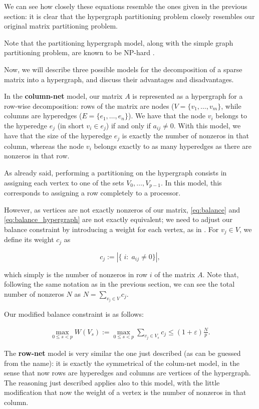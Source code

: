 We can see how closely these equations resemble the ones given in the previous section: it is clear that the hypergraph partitioning problem closely resembles our original matrix partitioning problem.

Note that the partitioning hypergraph model, along with the simple graph partitioning problem, are known to be NP-hard \cite[Ch.~6]{lengauer}. 

Now, we will describe three possible models for the decomposition of a sparse matrix into a hypergraph, and discuss their advantages and disadvantages.

In the \textbf{column-net} model, our matrix $A$ is represented as a hypergraph for a row-wise decomposition: rows of the matrix are nodes ($V=\{v_1,\dots,v_m\}$, while columns are hyperedges ($E= \{e_1,\dots,e_n\}$). We have that the node $v_i$ belongs to the hyperedge $e_j$ (in short $v_i \in e_j$) if and only if $a_{ij} \neq 0$. With this model, we have that the size of the hyperedge $e_j$ is exactly the number of nonzeros in that column, whereas the node $v_i$ belongs exactly to as many hyperedges as there are nonzeros in that row.

As already said, performing a partitioning on the hypergraph consists in assigning each vertex to one of the sets $V_0,\dots,V_{p-1}$. In this model, this corresponds to assigning a row completely to a processor.

However, as vertices are not exactly nonzeros of our matrix, \eqref{eq:balance} and \eqref{eq:balance_hypergraph} are not exactly equivalent; we need to adjust our balance constraint by introducing a weight for each vertex, as in \cite[Def.~4.34]{BSP}. For $v_j \in V$, we define its weight $c_j$ as

\[
	c_j := |\{\;i : \;a_{ij} \neq 0\}|,
\]

which simply is the number of nonzeros in row $i$ of the matrix $A$. Note that, following the same notation as in the previous section, we can see the total number of nonzeros $N$ as $N = \sum_{v_j \in V} c_j$.

Our modified balance constraint is as follows:

\begin{align}
	\max_{0 \leq s <p}	W(V_s) := \max_{0 \leq s <p} \sum_{v_j \in V_s} c_j \leq (1 + \varepsilon) \frac{N}{p}.
	\label{eq:balance_columnet}
\end{align}

The \textbf{row-net} model is very similar the one just described (as can be guessed from the name): it is exactly the symmetrical of the colum-net model, in the sense that now rows are hyperedges and columns are vertices of the hypergraph. The reasoning just described applies also to this model, with the little modification that now the weight of a vertex is the number of nonzeros in that column.

